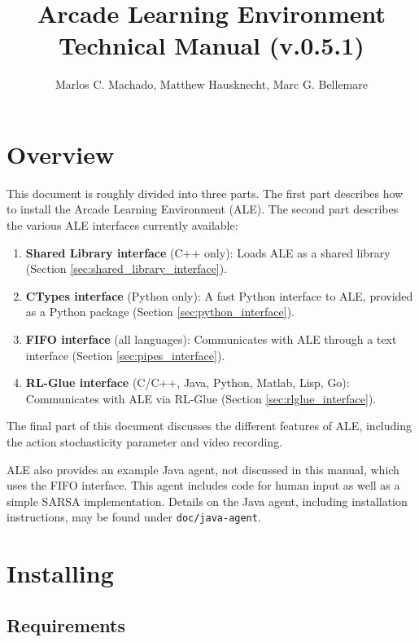 \documentclass[12pt]{article}
\title{Arcade Learning Environment\\ Technical Manual (v.0.5.1)}
\author{Marlos C. Machado, Matthew Hausknecht, Marc G. Bellemare}
\begin{document}
\maketitle

\clearpage

\tableofcontents

\clearpage

\section{Overview}

This document is roughly divided into three parts. The first part describes how to install the Arcade Learning Environment (ALE). The second part describes the various ALE interfaces currently available: 
\begin{enumerate}
  \item \textbf{Shared Library interface} (C++ only): Loads ALE as a shared library (Section 
  \ref{sec:shared_library_interface}).
  \item \textbf{CTypes interface} (Python only): A fast Python interface to ALE, provided as a Python package (Section \ref{sec:python_interface}).
  \item \textbf{FIFO interface} (all languages): Communicates with ALE through a text interface (Section \ref{sec:pipes_interface}).
  \item \textbf{RL-Glue interface} (C/C++, Java, Python, Matlab, Lisp, Go): Communicates with ALE via RL-Glue (Section \ref{sec:rlglue_interface}).
\end{enumerate}
The final part of this document discusses the different features of ALE, including the action stochasticity parameter and video recording.

ALE also provides an example Java agent, not discussed in this manual, which uses the FIFO interface. This agent includes code for human input as well as a simple SARSA implementation. Details on the Java agent, including installation instructions, may be found under \verb+doc/java-agent+.

\section{Installing}\label{sec:install}

\subsection{Requirements}
\end{document}
